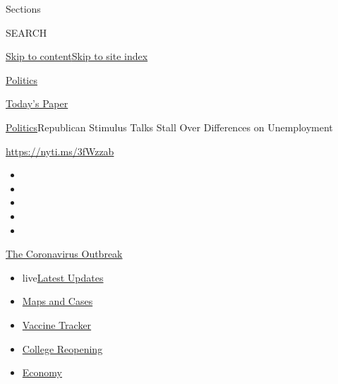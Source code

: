 Sections

SEARCH

\protect\hyperlink{site-content}{Skip to
content}\protect\hyperlink{site-index}{Skip to site index}

\href{https://www.nytimes.com/section/politics}{Politics}

\href{https://myaccount.nytimes.com/auth/login?response_type=cookie\&client_id=vi}{}

\href{https://www.nytimes.com/section/todayspaper}{Today's Paper}

\href{/section/politics}{Politics}\textbar{}Republican Stimulus Talks
Stall Over Differences on Unemployment

\url{https://nyti.ms/3fWzzab}

\begin{itemize}
\item
\item
\item
\item
\item
\end{itemize}

\href{https://www.nytimes.com/news-event/coronavirus?action=click\&pgtype=Article\&state=default\&region=TOP_BANNER\&context=storylines_menu}{The
Coronavirus Outbreak}

\begin{itemize}
\tightlist
\item
  live\href{https://www.nytimes.com/2020/08/04/world/coronavirus-covid-19.html?action=click\&pgtype=Article\&state=default\&region=TOP_BANNER\&context=storylines_menu}{Latest
  Updates}
\item
  \href{https://www.nytimes.com/interactive/2020/us/coronavirus-us-cases.html?action=click\&pgtype=Article\&state=default\&region=TOP_BANNER\&context=storylines_menu}{Maps
  and Cases}
\item
  \href{https://www.nytimes.com/interactive/2020/science/coronavirus-vaccine-tracker.html?action=click\&pgtype=Article\&state=default\&region=TOP_BANNER\&context=storylines_menu}{Vaccine
  Tracker}
\item
  \href{https://www.nytimes.com/2020/08/02/us/covid-college-reopening.html?action=click\&pgtype=Article\&state=default\&region=TOP_BANNER\&context=storylines_menu}{College
  Reopening}
\item
  \href{https://www.nytimes.com/live/2020/08/03/business/stock-market-today-coronavirus?action=click\&pgtype=Article\&state=default\&region=TOP_BANNER\&context=storylines_menu}{Economy}
\end{itemize}

